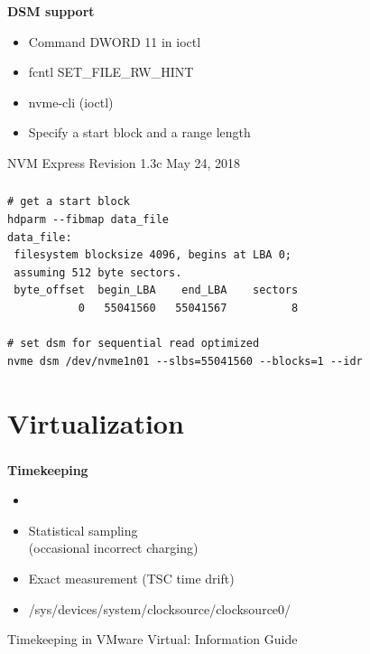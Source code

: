 \documentclass[usenames,dvipsnames, 18pt, compress, aspectratio=169]{beamer}
\begin{document}
\begin{frame}
    \frametitle{}
    \begin{center}
    \textbf{DSM support}

        \begin{itemize}[label={\MVRightarrow}]
            \item Command DWORD 11 in ioctl
            \item fcntl SET\_FILE\_RW\_HINT
            \item nvme-cli (ioctl)
            \item Specify a start block and a range length
        \end{itemize}

        \normalsize{NVM Express Revision 1.3c May 24, 2018}

    \end{center}
\end{frame}

\begin{frame}[fragile]{}
    \frametitle{}
    \begin{center}

        \begin{verbatim}
# get a start block
hdparm --fibmap data_file
data_file:
 filesystem blocksize 4096, begins at LBA 0;
 assuming 512 byte sectors.
 byte_offset  begin_LBA    end_LBA    sectors
           0   55041560   55041567          8

# set dsm for sequential read optimized
nvme dsm /dev/nvme1n01 --slbs=55041560 --blocks=1 --idr
        \end{verbatim}

    \end{center}
\end{frame}

\fontsize{13pt}{14}\selectfont
\section{Virtualization}
\fontsize{17pt}{18}\selectfont

\begin{frame}
    \frametitle{}
    \begin{center}
    \textbf{Timekeeping}

        \begin{itemize}
            \item <+->
        \end{itemize}

        \begin{itemize}[label={\MVRightarrow}]
            \item <+-> Statistical sampling \\ (occasional incorrect charging)
            \item <+-> Exact measurement (TSC time drift)
            \item <+-> /sys/devices/system/clocksource/clocksource0/
        \end{itemize}

        \normalsize{Timekeeping in VMware Virtual: Information Guide}
    \end{center}
\end{frame}
\end{document}
